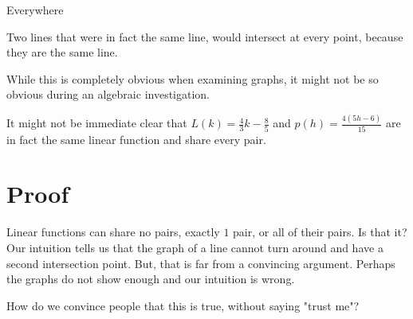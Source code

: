 \documentclass{ximera}
\begin{document}
\begin{example} Everywhere 

Two lines that were in fact the same line, would intersect at every point, because they are the same line.
\begin{image}
\end{image}


While this is completely obvious when examining graphs, it might not be so obvious during an algebraic investigation.

It might not be immediate clear that $L(k) = \frac{4}{3}k - \frac{8}{5}$ and $p(h) = \frac{4(5h-6)}{15}$ are in fact the same linear function and share every pair.

\end{example}










\section{Proof}



Linear functions can share no pairs, exactly $1$ pair, or all of their pairs.  Is that it?  Our intuition tells us that the graph of a line cannot turn around and have a second intersection point.  But, that is far from a convincing argument.  Perhaps the graphs do not show enough and our intuition is wrong.  

How do we convince people that this is true, without saying "trust me"?
\end{document}
